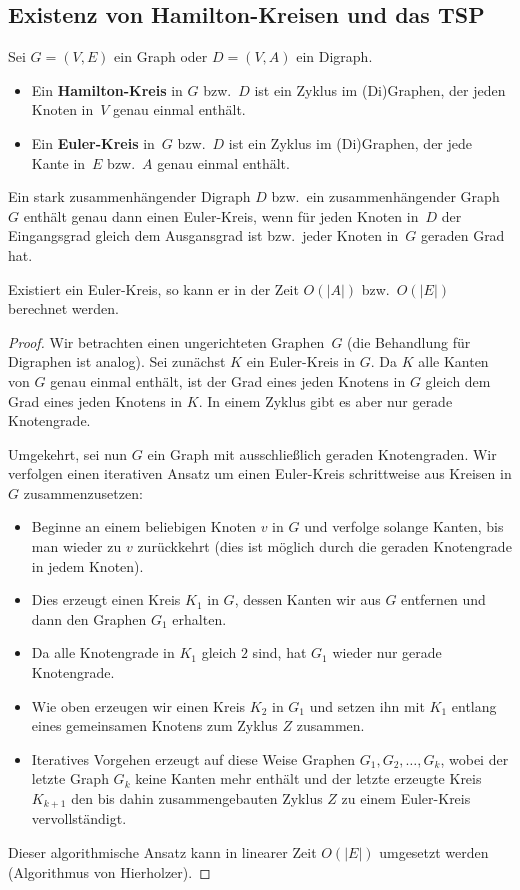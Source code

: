 \condclearpage
\subsection{Existenz von Hamilton-Kreisen und das TSP}

\begin{defn}
Sei $G = (V,E)$ ein Graph oder $D = (V,A)$ ein Digraph.
\begin{itemize}
 \item Ein \textbf{Hamilton-Kreis} in $G$ bzw.~$D$ ist ein Zyklus im (Di)Graphen, der jeden Knoten in~$V$ genau einmal enthält.
 \item Ein \textbf{Euler-Kreis} in~$G$ bzw.~$D$ ist ein Zyklus im (Di)Graphen, der jede Kante in~$E$ bzw.~$A$ genau einmal enthält.
\end{itemize}
\end{defn}

\begin{lem}
\label{lem:existenz-euler-kreis}
Ein stark zusammenhängender Digraph $D$ bzw.~ein zusammenhängender Graph~$G$ enthält genau dann einen Euler-Kreis, wenn für jeden Knoten in~$D$ der Eingangsgrad gleich dem Ausgansgrad ist bzw.~jeder Knoten in~$G$ geraden Grad hat.

Existiert ein Euler-Kreis, so kann er in der Zeit $O(|A|)$ bzw.~$O(|E|)$ berechnet werden.
\end{lem}
\begin{proof}
Wir betrachten einen ungerichteten Graphen~$G$ (die Behandlung für Digraphen ist analog).
Sei zunächst $K$ ein Euler-Kreis in $G$. Da $K$ alle Kanten von $G$ genau einmal enthält, ist der Grad eines jeden Knotens in $G$ gleich dem Grad eines jeden Knotens in $K$.
In einem Zyklus gibt es aber nur gerade Knotengrade.

Umgekehrt, sei nun $G$ ein Graph mit ausschlie\ss lich geraden Knotengraden.
Wir verfolgen einen iterativen Ansatz um einen Euler-Kreis schrittweise aus Kreisen in $G$ zusammenzusetzen:
\begin{itemize}
 \item Beginne an einem beliebigen Knoten $v$ in $G$ und verfolge solange Kanten, bis man wieder zu $v$ zurückkehrt (dies ist möglich durch die geraden Knotengrade in jedem Knoten).
 \item Dies erzeugt einen Kreis $K_1$ in $G$, dessen Kanten wir aus $G$ entfernen und dann den Graphen $G_1$ erhalten.
 \item Da alle Knotengrade in $K_1$ gleich $2$ sind, hat $G_1$ wieder nur gerade Knotengrade.
 \item Wie oben erzeugen wir einen Kreis $K_2$ in $G_1$ und setzen ihn mit $K_1$ entlang eines gemeinsamen Knotens zum Zyklus $Z$ zusammen.
 \item Iteratives Vorgehen erzeugt auf diese Weise Graphen $G_1,G_2,\ldots,G_k$, wobei der letzte Graph $G_k$ keine Kanten mehr enthält und der letzte erzeugte Kreis $K_{k+1}$ den bis dahin zusammengebauten Zyklus $Z$ zu einem Euler-Kreis vervollständigt.
\end{itemize}
%
Dieser algorithmische Ansatz kann in linearer Zeit $O(|E|)$ umgesetzt werden (Algorithmus von Hierholzer).
\end{proof}

